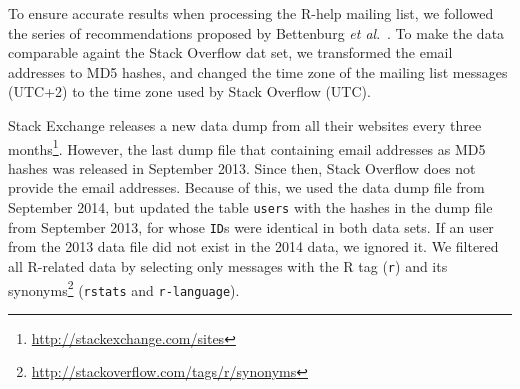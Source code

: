\documentclass{sig-alternate-05-2015}
\begin{document}


To ensure accurate results when processing the R-help mailing list, we followed the series of recommendations proposed by Bettenburg \textit{et al}.~\cite{Bettenburg2009}.
To make the data comparable againt the Stack Overflow dat set, we transformed the email addresses to MD5 hashes, and changed the time zone of the mailing list messages (UTC+2) to the time zone used by Stack Overflow (UTC).

Stack Exchange releases a new data dump from all their websites every three months\footnote{\url{http://stackexchange.com/sites}}.
However, the last dump file that containing email addresses as MD5 hashes was released in September 2013.
Since then, Stack Overflow does not provide the email addresses.
Because of this, we used the data dump file from September 2014, but updated the table \texttt{users} with the hashes in the dump file from September 2013, for whose \texttt{ID}s were identical in both data sets.
If an user from the 2013 data file did not exist in the 2014 data, we ignored it.
We filtered all R-related data by selecting only messages with the R tag (\texttt{r}) and its synonyms\footnote{\url{http://stackoverflow.com/tags/r/synonyms}} (\texttt{rstats} and \texttt{r-language}).

\end{document}
